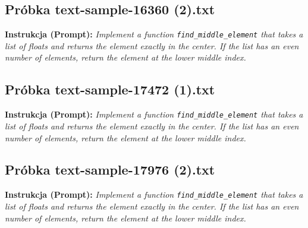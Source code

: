 


\subsection{Próbka text-sample-16360 (2).txt}
\label{sec:lst:text-sample-16360-2}
\textbf{Instrukcja (Prompt):} \textit{Implement a function \texttt{find\_middle\_element} that takes a list of floats and returns the element exactly in the center. If the list has an even number of elements, return the element at the lower middle index.}




\subsection{Próbka text-sample-17472 (1).txt}
\label{sec:lst:text-sample-17472-1}
\textbf{Instrukcja (Prompt):} \textit{Implement a function \texttt{find\_middle\_element} that takes a list of floats and returns the element exactly in the center. If the list has an even number of elements, return the element at the lower middle index.}




\subsection{Próbka text-sample-17976 (2).txt}
\label{sec:lst:text-sample-17976-2}
\textbf{Instrukcja (Prompt):} \textit{Implement a function \texttt{find\_middle\_element} that takes a list of floats and returns the element exactly in the center. If the list has an even number of elements, return the element at the lower middle index.}

